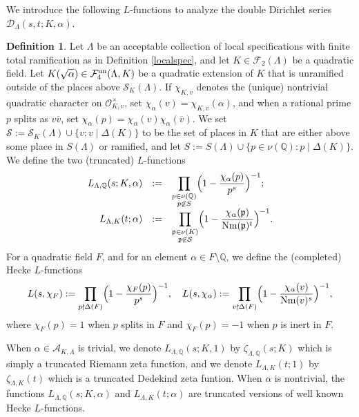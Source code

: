 \documentclass[10pt]{article}
\theoremstyle{plain}
\theoremstyle{definition}
\newtheorem{defn}[thm]{Definition}
\theoremstyle{remark}
\def\un{{\rm un}}
\def\val{{\nu}}
\def\Q{{\mathbb Q}}
\def\Q{{\mathbb Q}}
\def\bQ{{\mathbb Q}}
\def\cD{{\mathcal D}}
\def\cF{{\mathcal F}}
\def\bQ{{\mathbb Q}}
\def\cO{{\mathcal O}}
\def\cS{{\mathcal S}}
\def\fp{{\mathfrak p}}
\newcommand{\cA}{{\mathcal A}}
\DeclareMathOperator{\Nm}{Nm}
\begin{document}
We introduce the following $L$-functions to analyze the double
Dirichlet series $\cD_\Lambda(s,t;K,\alpha)$.
\begin{defn}
Let $\Lambda$ be an acceptable collection of local 
specifications with finite total ramification as in Definition \ref{localspec}, and let $K \in
\cF_2(\Lambda)$ be a quadratic field. Let $K(\sqrt{\alpha}) \in
\cF_4^{\un}(\Lambda,K)$ be a quadratic extension of $K$ that is
unramified outside of the places above $\cS_K(\Lambda)$. If $\chi_{K,v}$ denotes the (unique) nontrivial quadratic character on $\cO_{K,v}^\times$, set
$\chi_\alpha(v)=\chi_{K,v}(\alpha)$, and when a rational prime $p$
splits as $v\overline{v}$, set
$\chi_\alpha(p)=\chi_\alpha(v)\chi_\alpha(\overline{v})$.  We set
$\cS:=\cS_K(\Lambda)\cup\{v:v\mid\Delta(K)\}$ to be the set of places
in $K$ that are either above some place in $S(\Lambda)$ or
ramified, and let $S:=S(\Lambda) \cup \{p \in
\val(\bQ) : p \mid \Delta(K)\}$. We define
the two (truncated) $L$-functions
\begin{equation}\label{rationalquadraticLfunction}
\begin{array}{rcl}
L_{\Lambda,\Q}(s;K,\alpha)&:=&\displaystyle
\prod_{\substack{p\in\val(\Q)\\ p\not\in S}}
\Bigl(1-\frac{\chi_\alpha(p)}{p^s}\Bigr)^{-1};
\\[.2in]    
L_{\Lambda,K}(t;\alpha)&:=&\displaystyle
\prod_{\substack{\fp\in\val(K)\\\fp\not\in\cS}}
\Bigl(1-\frac{\chi_\alpha(\fp)}{\Nm(\fp)^t}\Bigr)^{-1}.
\end{array}
\end{equation}
For a quadratic field $F$, and for an element $\alpha\in F \setminus \bQ$, 
we define the (completed) Hecke $L$-functions
\begin{equation*}
L(s,\chi_F):=\prod_{p\nmid\Delta(F)}\Bigl(1-\frac{\chi_F(p)}{p^s}\Bigr)^{-1},\quad
L(s,\chi_\alpha):=\prod_{v\nmid\Delta(F)}\Bigl(1-\frac{\chi_\alpha(v)}{\Nm(v)^s}\Bigr)^{-1},
\end{equation*}
where $\chi_F(p)=1$ when $p$ splits in $F$ and $\chi_F(p)=-1$ when $p$ is
inert in $F$.
\end{defn}
When $\alpha \in \cA_{K,\Lambda}$ is trivial, we denote
$L_{\Lambda,\Q}(s;K,1)$ by $\zeta_{\Lambda,\Q}(s;K)$ which is simply a
truncated Riemann zeta function, and we denote $L_{\Lambda,K}(t;1)$ by
$\zeta_{\Lambda,K}(t)$ which is a truncated Dedekind zeta
funtion. When $\alpha$ is nontrivial, the functions
$L_{\Lambda,\Q}(s;K,\alpha)$ and $L_{\Lambda,K}(t;\alpha)$ are
truncated versions of well known Hecke $L$-functions.
\end{document}
